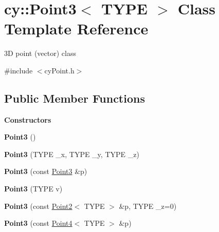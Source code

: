 \hypertarget{classcy_1_1_point3}{}\section{cy\+::Point3$<$ T\+Y\+PE $>$ Class Template Reference}
\label{classcy_1_1_point3}


3D point (vector) class  




{\ttfamily \#include $<$cy\+Point.\+h$>$}

\subsection*{Public Member Functions}
\begin{Indent}\textbf{ Constructors}\par
\begin{DoxyCompactItemize}
\item 
\mbox{\label{classcy_1_1_point3_aa0644165c571ee16a1a99c1ca831e132}} 
{\bfseries Point3} ()
\item 
\mbox{\label{classcy_1_1_point3_aad956231dce1e6daf7928d3f81cd45f8}} 
{\bfseries Point3} (T\+Y\+PE \+\_\+x, T\+Y\+PE \+\_\+y, T\+Y\+PE \+\_\+z)
\item 
\mbox{\label{classcy_1_1_point3_a23646c4a8a108e6772235ceed3ccf0a6}} 
{\bfseries Point3} (const \mbox{\hyperlink{classcy_1_1_point3}{Point3}} \&p)
\item 
\mbox{\label{classcy_1_1_point3_ab686cc76f87d6de165b60677f3686931}} 
{\bfseries Point3} (T\+Y\+PE v)
\item 
\mbox{\label{classcy_1_1_point3_a54f3a30bf51892c23c4b3e69c75615f2}} 
{\bfseries Point3} (const \mbox{\hyperlink{classcy_1_1_point2}{Point2}}$<$ T\+Y\+PE $>$ \&p, T\+Y\+PE \+\_\+z=0)
\item 
\mbox{\label{classcy_1_1_point3_ae125de81b2922190b2dfe5e86962ddef}} 
{\bfseries Point3} (const \mbox{\hyperlink{classcy_1_1_point4}{Point4}}$<$ T\+Y\+PE $>$ \&p)
\item 
\mbox{\label{classcy_1_1_point3_a9f02bcf8ab4c6fda5a621307002cf3ea}} 

\end{DoxyCompactItemize}
\end{Indent}
